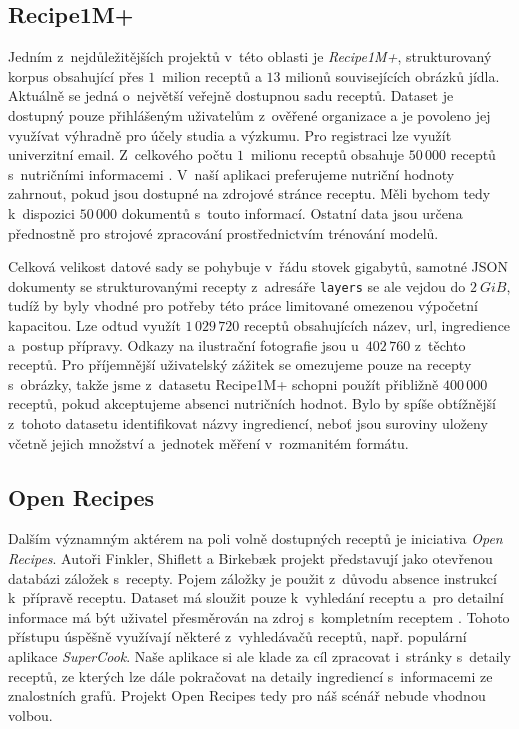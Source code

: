 \subsection{Recipe1M+}

Jedním z~nejdůležitějších projektů v~této oblasti je \emph{Recipe1M+}, strukturovaný korpus obsahující přes $1$~milion receptů a $13$ milionů souvisejících obrázků jídla. Aktuálně se jedná o~největší veřejně dostupnou sadu receptů. Dataset je dostupný pouze přihlášeným uživatelům z~ověřené organizace a je povoleno jej využívat výhradně pro účely studia a výzkumu. Pro registraci lze využít univerzitní email. Z~celkového počtu $1$~milionu receptů obsahuje $50\,000$ receptů s~nutričními informacemi \citep{marin2019learning}. V~naší aplikaci preferujeme nutriční hodnoty zahrnout, pokud jsou dostupné na zdrojové stránce receptu. Měli bychom tedy k~dispozici $50\,000$ dokumentů s~touto informací. Ostatní data jsou určena přednostně pro strojové zpracování prostřednictvím trénování modelů.

Celková velikost datové sady se pohybuje v~řádu stovek gigabytů, samotné JSON dokumenty se strukturovanými recepty z~adresáře \texttt{layers} se ale vejdou do $2~GiB$, tudíž by byly vhodné pro potřeby této práce limitované omezenou výpočetní kapacitou. Lze odtud využít $1\,029\,720$ receptů obsahujících název, url, ingredience a~postup přípravy. Odkazy na ilustrační fotografie jsou u~$402\,760$ z~těchto receptů. Pro příjemnější uživatelský zážitek se omezujeme pouze na recepty s~obrázky, takže jsme z~datasetu Recipe1M+ schopni použít přibližně $400\,000$ receptů, pokud akceptujeme absenci nutričních hodnot. Bylo by spíše obtížnější z~tohoto datasetu identifikovat názvy ingrediencí, neboť jsou suroviny uloženy včetně jejich množství a~jednotek měření v~rozmanitém formátu.

\subsection{Open Recipes}

Dalším významným aktérem na poli volně dostupných receptů je iniciativa \emph{Open Recipes}. Autoři Finkler, Shiflett a Birkebæk projekt představují jako otevřenou databázi záložek s~recepty. Pojem záložky je použit z~důvodu absence instrukcí k~přípravě receptu. Dataset má sloužit pouze k~vyhledání receptu a~pro detailní informace má být uživatel přesměrován na zdroj s~kompletním receptem \citep{open-recipes}. Tohoto přístupu úspěšně využívají některé z~vyhledávačů receptů, např. populární aplikace \emph{SuperCook}. Naše aplikace si ale klade za cíl zpracovat i~stránky s~detaily receptů, ze kterých lze dále pokračovat na detaily ingrediencí s~informacemi ze znalostních grafů. Projekt Open Recipes tedy pro náš scénář nebude vhodnou volbou.

